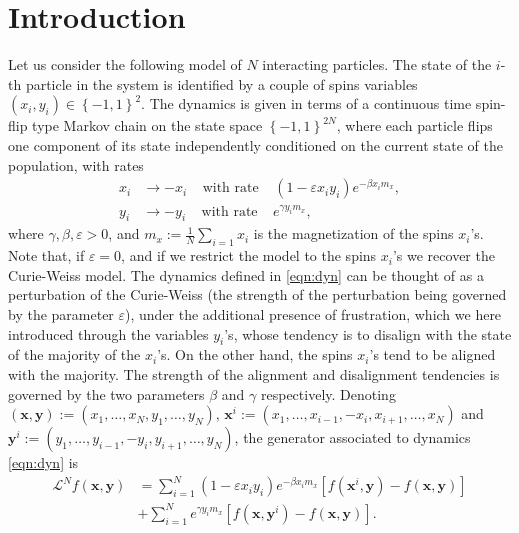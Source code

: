 \documentclass[a4paper,10pt,leqno]{amsart}
\theoremstyle{plain}
\begin{document}
\section{Introduction}
Let us consider the following model of $N$ interacting particles. The state of the $i$-th particle in the system is identified by a couple of spins variables $(x_i,y_i) \in \left\{-1,1\right\}^2$. The dynamics is given in terms of a continuous time spin-flip type Markov chain on the state space $\left\{-1,1\right\}^{2N}$, where each particle flips one component of its state independently conditioned on the current state of the population, with rates
\begin{align}
\label{eqn:dyn}
x_i &\rightarrow -x_i \ \ \ \ \ \text{with rate} \ \ \ \ \ (1-\varepsilon x_i y_i)e^{-\beta x_i m_x},\\
y_i &\rightarrow -y_i \ \ \ \ \ \text{with rate} \ \ \ \ \ e^{\gamma y_i m_x},\nonumber
\end{align}
where $\gamma, \beta, \varepsilon > 0$, and $m_x := \frac{1}{N}\sum_{i=1}x_i$ is the magnetization of the spins $x_i$'s.
Note that, if $\varepsilon = 0$, and if we restrict the model to the spins $x_i$'s we recover the Curie-Weiss model. The dynamics defined in \eqref{eqn:dyn} can be thought of as a perturbation of the Curie-Weiss (the strength of the perturbation being governed by the parameter $\varepsilon$), under the additional presence of frustration, which we here introduced through the variables $y_i$'s, whose tendency is to disalign with the state of the majority of the $x_i$'s. On the other hand, the spins $x_i$'s tend to be aligned with the majority. The strength of the alignment and disalignment tendencies is governed by the two parameters $\beta$ and $\gamma$ respectively.
Denoting $(\bm{x},\bm{y}) := (x_1,\dots,x_N,y_1,\dots,y_N)$, $\bm{x}^i := (x_1,\dots,x_{i-1},-x_i,x_{i+1},\dots,x_N)$ and $\bm{y}^i := (y_1,\dots,y_{i-1},-y_i,y_{i+1},\dots,y_N)$, the generator associated to dynamics \eqref{eqn:dyn} is 
\begin{align}
\label{eqn:gen}
\mathcal{L}^N f(\bm{x},\bm{y}) &= \sum_{i=1}^N (1-\varepsilon x_i y_i) e^{-\beta x_i m_x}\left[f(\bm{x}^i,\bm{y}) - f(\bm{x},\bm{y})\right] \nonumber\\
& + \sum_{i=1}^N e^{\gamma y_i m_x}\left[f(\bm{x},\bm{y}^i) - f(\bm{x},\bm{y})\right]. 
\end{align}
\end{document}
